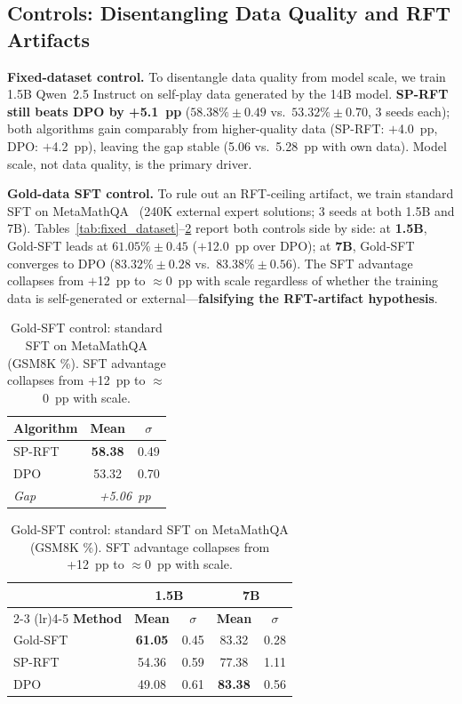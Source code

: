 \documentclass{article}
\newcommand{\sprft}{SP-RFT}
\begin{document}
\subsection{Controls: Disentangling Data Quality and RFT Artifacts}
\label{sec:controls}

\textbf{Fixed-dataset control.} To disentangle data quality from model scale, we train 1.5B Qwen~2.5 Instruct on self-play data generated by the 14B model. \textbf{\sprft{} still beats DPO by +5.1~pp} ($58.38\%\pm 0.49$ vs.\ $53.32\%\pm 0.70$, 3 seeds each); both algorithms gain comparably from higher-quality data (\sprft{}: $+$4.0~pp, DPO: $+$4.2~pp), leaving the gap stable (5.06 vs.\ 5.28~pp with own data). Model scale, not data quality, is the primary driver.

\textbf{Gold-data SFT control.} To rule out an RFT-ceiling artifact, we train standard SFT on MetaMathQA~\citep{yu2024metamath} (240K external expert solutions; 3 seeds at both 1.5B and 7B). Tables~\ref{tab:fixed_dataset}--\ref{tab:gold_sft} report both controls side by side: at \textbf{1.5B}, Gold-SFT leads at $61.05\%\pm 0.45$ ($+$12.0~pp over DPO); at \textbf{7B}, Gold-SFT converges to DPO ($83.32\%\pm 0.28$ vs.\ $83.38\%\pm 0.56$). The SFT advantage collapses from $+$12~pp to $\approx$0~pp with scale regardless of whether the training data is self-generated or external---\textbf{falsifying the RFT-artifact hypothesis}.

\begin{table}[t]
\begin{minipage}[t]{0.46\textwidth}
\centering
\caption{Fixed-dataset control: 1.5B on \emph{14B} self-play data (GSM8K \%). \sprft{} still leads by +5.1~pp.}
\small
\begin{tabular}{@{}lcc@{}}
\toprule
\textbf{Algorithm} & \textbf{Mean} & $\sigma$ \\
\midrule
\sprft{} & \textbf{58.38} & 0.49 \\
DPO & 53.32 & 0.70 \\
\midrule
\textit{Gap} & \multicolumn{2}{c}{\textit{+5.06~pp}} \\
\bottomrule
\end{tabular}
\label{tab:fixed_dataset}
\end{minipage}
\hfill
\begin{minipage}[t]{0.52\textwidth}
\centering
\caption{Gold-SFT control: standard SFT on MetaMathQA (GSM8K \%). SFT advantage collapses from +12~pp to $\approx$0~pp with scale.}
\small
\begin{tabular}{@{}lcccc@{}}
\toprule
& \multicolumn{2}{c}{\textbf{1.5B}} & \multicolumn{2}{c}{\textbf{7B}} \\
\cmidrule(lr){2-3} \cmidrule(lr){4-5}
\textbf{Method} & \textbf{Mean} & $\sigma$ & \textbf{Mean} & $\sigma$ \\
\midrule
Gold-SFT & \textbf{61.05} & 0.45 & 83.32 & 0.28 \\
\sprft{} & 54.36 & 0.59 & 77.38 & 1.11 \\
DPO & 49.08 & 0.61 & \textbf{83.38} & 0.56 \\
\bottomrule
\end{tabular}
\label{tab:gold_sft}
\end{minipage}
\end{table}
\end{document}
